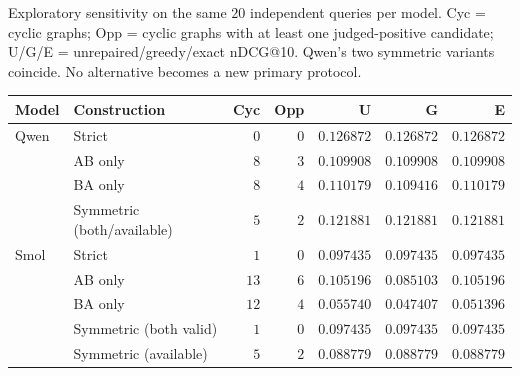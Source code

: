 \begin{supplementtable}
\caption{Exploratory sensitivity on the same $20$ independent queries per model. Cyc = cyclic graphs; Opp = cyclic graphs with at least one judged-positive candidate; U/G/E = unrepaired/greedy/exact nDCG@10. Qwen's two symmetric variants coincide. No alternative becomes a new primary protocol.}
\label{tab:construction-utility}
\sncstable
\begin{tabularx}{\linewidth}{@{}lYrrrrr@{}}
\toprule
Model & Construction & Cyc & Opp & U & G & E \\
\midrule
Qwen & Strict & $0$ & $0$ & $0.126872$ & $0.126872$ & $0.126872$ \\
& AB only & $8$ & $3$ & $0.109908$ & $0.109908$ & $0.109908$ \\
& BA only & $8$ & $4$ & $0.110179$ & $0.109416$ & $0.110179$ \\
& Symmetric (both/available) & $5$ & $2$ & $0.121881$ & $0.121881$ & $0.121881$ \\
\addlinespace
Smol & Strict & $1$ & $0$ & $0.097435$ & $0.097435$ & $0.097435$ \\
& AB only & $13$ & $6$ & $0.105196$ & $0.085103$ & $0.105196$ \\
& BA only & $12$ & $4$ & $0.055740$ & $0.047407$ & $0.051396$ \\
& Symmetric (both valid) & $1$ & $0$ & $0.097435$ & $0.097435$ & $0.097435$ \\
& Symmetric (available) & $5$ & $2$ & $0.088779$ & $0.088779$ & $0.088779$ \\
\bottomrule
\end{tabularx}
\end{supplementtable}